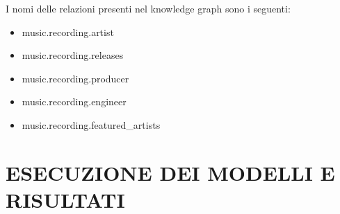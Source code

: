 \noindent I nomi delle relazioni presenti nel knowledge graph sono i seguenti:
\begin{itemize}
    \item music.recording.artist
    \item music.recording.releases
    \item music.recording.producer
    \item music.recording.engineer
    \item music.recording.featured\_artists
\end{itemize}




\section*{ESECUZIONE DEI MODELLI E RISULTATI}




